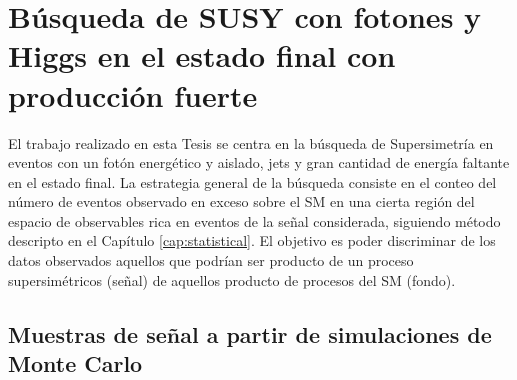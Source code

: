 \chapter{Búsqueda de SUSY con fotones y Higgs en el estado final con producción fuerte}




El trabajo realizado en esta Tesis se centra en la búsqueda de Supersimetría en eventos con un fotón energético y aislado, jets y gran cantidad de energía faltante en el estado final. La estrategia general de la búsqueda consiste en el conteo del número de eventos observado en exceso sobre el SM en una cierta región del espacio de observables rica en eventos de la señal considerada, siguiendo método descripto en el Capítulo \ref{cap:statistical}. El objetivo es poder discriminar de los datos observados aquellos que podrían ser producto de un proceso supersimétricos (señal) de aquellos producto de procesos del SM (fondo).


\section{Muestras de señal a partir de simulaciones de Monte Carlo}\label{sec:signal_samples}

